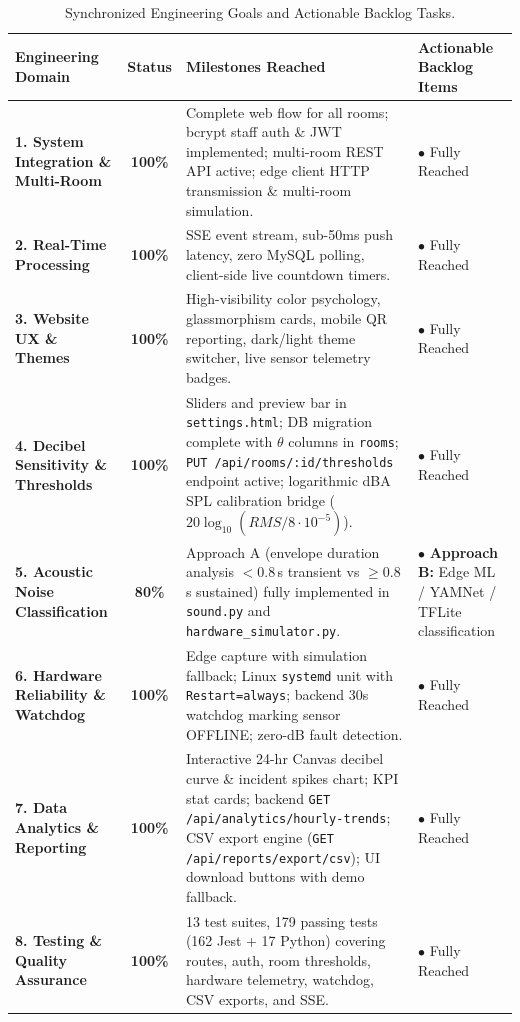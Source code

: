 \documentclass[11pt,a4paper]{article}
\begin{document}
\begin{table}[H]
\centering
\small
\begin{tabularx}{\textwidth}{p{3.5cm} c p{4.2cm} X}
\toprule
\textbf{Engineering Domain} & \textbf{Status} & \textbf{Milestones Reached} & \textbf{Actionable Backlog Items} \\
\midrule
\textbf{1. System Integration \& Multi-Room} & \textbf{100\%} & Complete web flow for all rooms; bcrypt staff auth \& JWT implemented; multi-room REST API active; edge client HTTP transmission \& multi-room simulation. & $\bullet$ Fully Reached \\
\midrule
\textbf{2. Real-Time Processing} & \textbf{100\%} & SSE event stream, sub-50ms push latency, zero MySQL polling, client-side live countdown timers. & $\bullet$ Fully Reached \\
\midrule
\textbf{3. Website UX \& Themes} & \textbf{100\%} & High-visibility color psychology, glassmorphism cards, mobile QR reporting, dark/light theme switcher, live sensor telemetry badges. & $\bullet$ Fully Reached \\
\midrule
\textbf{4. Decibel Sensitivity \& Thresholds} & \textbf{100\%} & Sliders and preview bar in \texttt{settings.html}; DB migration complete with $\theta$ columns in \texttt{rooms}; \texttt{PUT /api/rooms/:id/thresholds} endpoint active; logarithmic dBA SPL calibration bridge ($20 \log_{10}(RMS / 8\cdot 10^{-5})$). & $\bullet$ Fully Reached \\
\midrule
\textbf{5. Acoustic Noise Classification} & \textbf{80\%} & Approach A (envelope duration analysis $<0.8$\,s transient vs $\ge 0.8$\,s sustained) fully implemented in \texttt{sound.py} and \texttt{hardware\_simulator.py}. & $\bullet$ \textbf{Approach B:} Edge ML / YAMNet / TFLite classification \\
\midrule
\textbf{6. Hardware Reliability \& Watchdog} & \textbf{100\%} & Edge capture with simulation fallback; Linux \texttt{systemd} unit with \texttt{Restart=always}; backend 30s watchdog marking sensor OFFLINE; zero-dB fault detection. & $\bullet$ Fully Reached \\
\midrule
\textbf{7. Data Analytics \& Reporting} & \textbf{100\%} & Interactive 24-hr Canvas decibel curve \& incident spikes chart; KPI stat cards; backend \texttt{GET /api/analytics/hourly-trends}; CSV export engine (\texttt{GET /api/reports/export/csv}); UI download buttons with demo fallback. & $\bullet$ Fully Reached \\
\midrule
\textbf{8. Testing \& Quality Assurance} & \textbf{100\%} & 13 test suites, 179 passing tests (162 Jest + 17 Python) covering routes, auth, room thresholds, hardware telemetry, watchdog, CSV exports, and SSE. & $\bullet$ Fully Reached \\
\bottomrule
\end{tabularx}
\caption{Synchronized Engineering Goals and Actionable Backlog Tasks.}
\label{tab:backlog}
\end{table}
\end{document}
